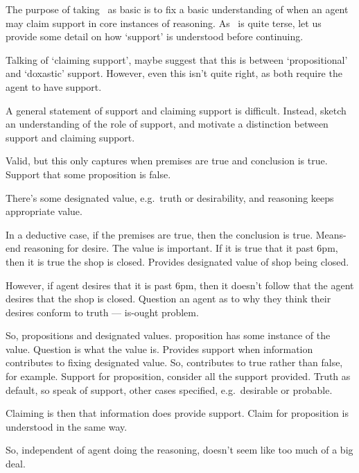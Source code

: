 \begin{note}[Support]
  The purpose of taking~\bP{} as basic is to fix a basic understanding of when an agent may claim support in core instances of reasoning.
  As~\bP{} is quite terse, let us provide some detail on how `support' is understood before continuing.

  {
    \color{red}
    Talking of `claiming support', maybe suggest that this is between `propositional' and `doxastic' support.
    However, even this isn't quite right, as both require the agent to have support.
  }
\end{note}

\begin{note}[Support]
  A general statement of support and claiming support is difficult.
  Instead, sketch an understanding of the role of support, and motivate a distinction between support and claiming support.

  Valid, but this only captures when premises are true and conclusion is true.
  Support that some proposition is false.

  There's some designated value, e.g.\ truth or desirability, and reasoning keeps appropriate value.

  In a deductive case, if the premises are true, then the conclusion is true.
  Means-end reasoning for desire.
  The value is important.
  If it is true that it past 6pm, then it is true the shop is closed.
  Provides designated value of shop being closed.

  However, if agent desires that it is past 6pm, then it doesn't follow that the agent desires that the shop is closed.
  Question an agent as to why they think their desires conform to truth --- is-ought problem.

  So, propositions and designated values.
  proposition has some instance of the value.
  Question is what the value is.
  Provides support when information contributes to fixing designated value.
  So, contributes to true rather than false, for example.
  Support for proposition, consider all the support provided.
  Truth as default, so speak of support, other cases specified, e.g.\ desirable or probable.

  Claiming is then that information does provide support.
  Claim for proposition is understood in the same way.

  So, independent of agent doing the reasoning, doesn't seem like too much of a big deal.


\end{note}

